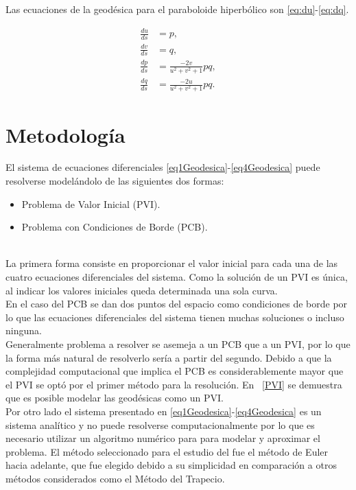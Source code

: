 \documentclass{endm}
\begin{document}
Las ecuaciones de la geod\'esica para el paraboloide hiperb\'olico son \ref{eq:du}-\ref{eq:dq}.

\begin{align}
\frac{du}{ds}&=p,\label{eq:du} \\
\frac{dv}{ds}&=q,\label{eq:dv}     \\
\frac{dp}{ds}&=\frac{-2v}{u^2+v^2+1} pq, \label{eq:dp}\\ 
\frac{dq}{ds}&=\frac{-2u}{u^2+v^2+1} pq. \label{eq:dq}
\end{align}



\clearpage

%
\section{Metodolog\'ia}\label{Metodo}
El sistema de ecuaciones diferenciales \ref{eq1Geodesica}-\ref{eq4Geodesica} puede resolverse model\'andolo de las siguientes dos formas:
\begin{itemize}
    \item Problema de Valor Inicial (PVI).
    \item Problema con Condiciones de Borde (PCB).
\end{itemize}
\\
La primera forma consiste en proporcionar el valor inicial para cada una de las cuatro ecuaciones diferenciales del sistema.
Como la soluci\'on de un PVI es \'unica, al indicar los valores iniciales queda determinada una sola curva. \\
En el caso del PCB se dan dos puntos del espacio como condiciones de borde por lo que las ecuaciones diferenciales del sistema tienen muchas soluciones o incluso ninguna. \\

Generalmente problema a resolver se asemeja a un PCB que a un PVI, por lo que la forma m\'as natural de resolverlo ser\'ia a partir del segundo. Debido a que la complejidad computacional que implica el PCB es considerablemente mayor que el PVI se opt\'o por el primer m\'etodo para la resoluci\'on. En ~\ref{PVI} se demuestra que es posible modelar las geod\'esicas como un PVI. \\

Por otro lado el sistema presentado en \ref{eq1Geodesica}-\ref{eq4Geodesica} es un sistema anal\'itico y no puede resolverse computacionalmente por lo que es necesario utilizar un algoritmo num\'erico para para modelar y aproximar el problema. El m\'etodo seleccionado para el estudio del fue el m\'etodo de Euler hacia adelante, que fue elegido debido a su simplicidad en comparaci\'on a otros m\'etodos considerados como el M\'etodo del Trapecio.
\end{document}
